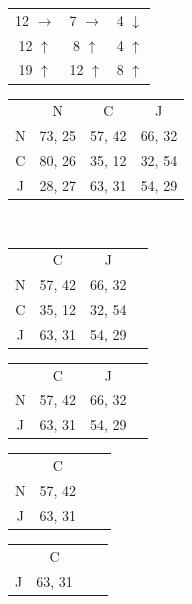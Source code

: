 \documentclass[12pt]{article}
\begin{document}
\problemasub
\begin{tabular}{ccc}
    12 $\rightarrow$ & 7 $\rightarrow$ & 4 $\downarrow$ \\
    12 $\uparrow$ & 8 $\uparrow$ & 4 $\uparrow$ \\
    19 $\uparrow$ & 12 $\uparrow$ & 8 $\uparrow$
\end{tabular}



\newpage
{}
\problem

\begin{tabular}{cccc}
    {}   & N      & C      & J      \\
    N    & 73, 25 & 57, 42 & 66, 32 \\
    C    & 80, 26 & 35, 12 & 32, 54 \\
    J    & 28, 27 & 63, 31 & 54, 29 \\
\end{tabular} \vspace{5mm} \\

\begin{tabular}{cccc}
    {}   & C      & J      \\
    N    & 57, 42 & 66, 32 \\
    C    & 35, 12 & 32, 54 \\
    J    & 63, 31 & 54, 29 \\
\end{tabular} \vspace{5mm}

\begin{tabular}{cccc}
    {}   & C      & J      \\
    N    & 57, 42 & 66, 32 \\
    J    & 63, 31 & 54, 29 \\
\end{tabular} \vspace{5mm}

\begin{tabular}{cccc}
    {}   & C      \\
    N    & 57, 42 \\
    J    & 63, 31 \\
\end{tabular} \vspace{5mm}

\begin{tabular}{cccc}
    {}   & C      \\
    J    & 63, 31 \\
\end{tabular} \vspace{5mm} \\
\end{document}
